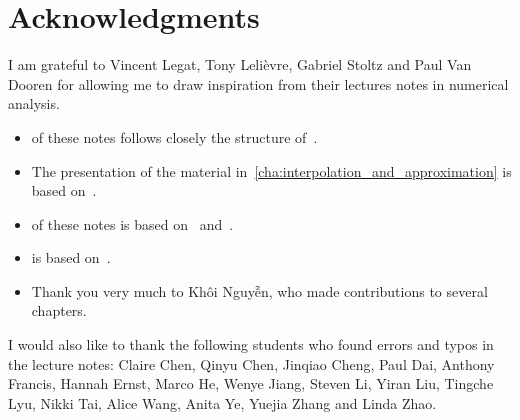\chapter*{Acknowledgments}%
\label{cha:acknowledgements}

I am grateful to Vincent Legat, Tony Lelièvre, Gabriel Stoltz and Paul Van Dooren for allowing me to draw inspiration from their lectures notes in numerical analysis.
\begin{itemize}
    \item 
         of these notes follows closely the structure of~\cite[Chapter 3]{VanDooren}.

    \item 
        The presentation of the material in~\cref{cha:interpolation_and_approximation} is based on~\cite{Legat}.

    \item
         of these notes is based on~\cite[Chapter 2]{cs} and~\cite[Chapter 5]{VanDooren}.

    \item
         is based on~\cite[Chapter 3]{cs}.
    \item
        Thank you very much to Kh\^oi Nguy\~{\^e}n,
        who made contributions to several chapters.
\end{itemize}
I would also like to thank the following students who found errors and typos in the lecture notes:
Claire Chen, Qinyu Chen, Jinqiao Cheng, Paul Dai, Anthony Francis, Hannah Ernst, Marco He, Wenye Jiang, Steven Li, Yiran Liu, Tingche Lyu, Nikki Tai, Alice Wang, Anita Ye, Yuejia Zhang and Linda Zhao.
